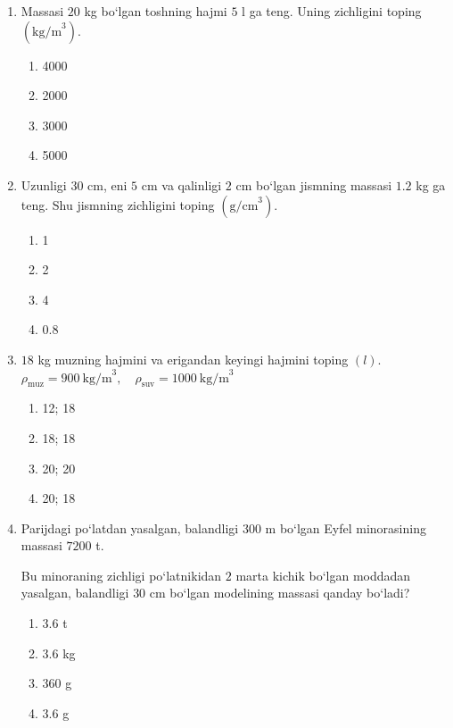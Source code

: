 \begin{enumerate}

\item Massasi $20$ kg bo‘lgan toshning hajmi $5$ l ga teng.
Uning zichligini toping $(\text{kg/m}^3)$.

\begin{enumerate}[label=\Alph*)]
\item 4000
\item 2000
\item 3000
\item 5000
\end{enumerate}


\item Uzunligi $30$ cm, eni $5$ cm va qalinligi $2$ cm bo‘lgan
jismning massasi $1.2$ kg ga teng.
Shu jismning zichligini toping $(\text{g/cm}^3)$.

\begin{enumerate}[label=\Alph*)]
\item 1
\item 2
\item 4
\item 0.8
\end{enumerate}


\item $18$ kg muzning hajmini va erigandan keyingi
hajmini toping $(l)$. $\rho_{\text{muz}} = 900\ \text{kg/m}^3, \quad \rho_{\text{suv}} = 1000\ \text{kg/m}^3$ 

\begin{enumerate}[label=\Alph*)]
\item 12; 18
\item 18; 18
\item 20; 20
\item 20; 18
\end{enumerate}


\item Parijdagi po‘latdan yasalgan, balandligi $300$ m
bo‘lgan Eyfel minorasining massasi $7200$ t.

Bu minoraning zichligi po‘latnikidan $2$ marta kichik
bo‘lgan moddadan yasalgan, balandligi $30$ cm
bo‘lgan modelining massasi qanday bo‘ladi?

\begin{enumerate}[label=\Alph*)]
\item 3.6 t
\item 3.6 kg
\item 360 g
\item 3.6 g

\end{enumerate}



\end{enumerate}
